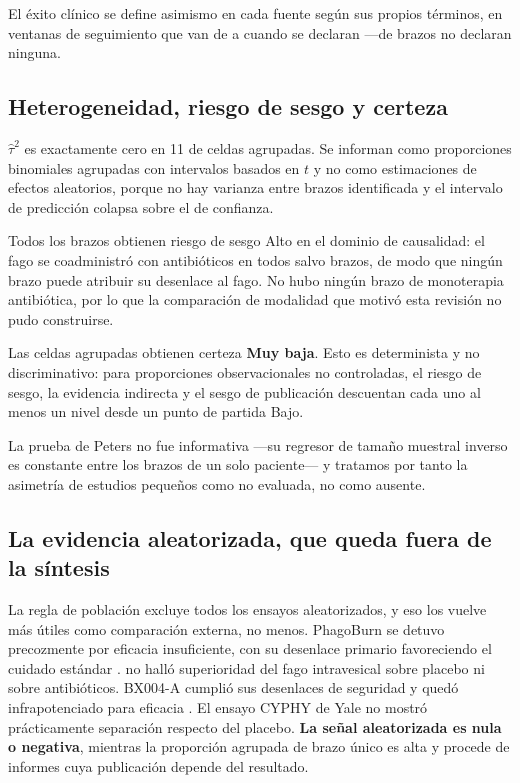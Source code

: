 \documentclass[12pt]{article}
\begin{document}
El éxito clínico se define asimismo en cada fuente según sus propios términos, en
ventanas de seguimiento que van de \FollowUpMin a \FollowUpMax cuando se declaran
---\FollowUpNotStated de \ArmsAnalysed brazos no declaran ninguna.

\subsection*{Heterogeneidad, riesgo de sesgo y certeza}

$\hat\tau^2$ es exactamente cero en 11 de \CellsPooled celdas agrupadas. Se
informan como proporciones binomiales agrupadas con intervalos basados en $t$ y
no como estimaciones de efectos aleatorios, porque no hay varianza entre brazos
identificada y el intervalo de predicción colapsa sobre el de confianza.

Todos los brazos obtienen riesgo de sesgo Alto en el dominio de causalidad: el
fago se coadministró con antibióticos en todos salvo \ModalityMonoArms brazos, de
modo que ningún brazo puede atribuir su desenlace al fago. No hubo ningún brazo
de monoterapia antibiótica, por lo que la comparación de modalidad que motivó
esta revisión no pudo construirse.

Las \CellsPooled celdas agrupadas obtienen certeza \textbf{Muy baja}. Esto es
determinista y no discriminativo: para proporciones observacionales no
controladas, el riesgo de sesgo, la evidencia indirecta y el sesgo de publicación
descuentan cada uno al menos un nivel desde un punto de partida Bajo.

La prueba de Peters no fue informativa ---su regresor de tamaño muestral inverso
es constante entre los brazos de un solo paciente--- y tratamos por tanto la
asimetría de estudios pequeños como no evaluada, no como ausente.

\subsection*{La evidencia aleatorizada, que queda fuera de la síntesis}

La regla de población excluye todos los ensayos aleatorizados, y eso los vuelve
más útiles como comparación externa, no menos. PhagoBurn se detuvo
precozmente por eficacia insuficiente, con su desenlace primario favoreciendo el
cuidado estándar \parencite{Jault2019_phagoburn}.
\textcite{Leitner2021_lancetid_pyophage} no halló superioridad del fago
intravesical sobre placebo ni sobre antibióticos. BX004-A cumplió sus desenlaces
de seguridad y quedó infrapotenciado para eficacia
\parencite{Weiner2025_natcomms}. El ensayo CYPHY de Yale no mostró prácticamente
separación respecto del placebo. \textbf{La señal aleatorizada es nula o
negativa}, mientras la proporción agrupada de brazo único es alta y procede de
informes cuya publicación depende del resultado.
\end{document}

